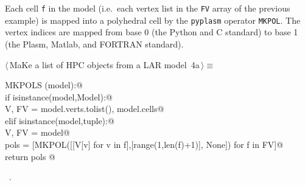 \documentclass[11pt,oneside]{article}	%
\begin{document}
Each cell \texttt{f} in the model (i.e.~each vertex list in the \texttt{FV} array of the previous example) is mapped into a polyhedral cell by the \texttt{pyplasm} operator \texttt{MKPOL}. The vertex indices are mapped from base 0 (the Python and C standard) to base 1 (the Plasm, Matlab, and FORTRAN standard).
\begin{flushleft} \small
\begin{minipage}{\linewidth} \label{scrap8}
\protect{}$\langle\,$MaKe a list of HPC objects from a LAR model\nobreak\ {\footnotesize 4a}$\,\rangle\equiv$
\vspace{-1ex}
\begin{list}{}{} \item
\mbox{}\verb@def MKPOLS (model):@\\
\mbox{}\verb@    if isinstance(model,Model):@\\
\mbox{}\verb@        V, FV = model.verts.tolist(), model.cells@\\
\mbox{}\verb@    elif isinstance(model,tuple):@\\
\mbox{}\verb@        V, FV = model@\\
\mbox{}\verb@    pols = [MKPOL([[V[v] for v in f],[range(1,len(f)+1)], None]) for f in FV]@\\
\mbox{}\verb@    return pols  @\\
\mbox{}\verb@@{\NWsep}
\end{list}
\vspace{-1ex}
\footnotesize\addtolength{\baselineskip}{-1ex}
\begin{list}{}{\setlength{\itemsep}{-\parsep}\setlength{\itemindent}{-\leftmargin}}
\item \NWtxtMacroRefIn\ .
\end{list}
\end{minipage}\\[4ex]
\end{flushleft}
\end{document}
